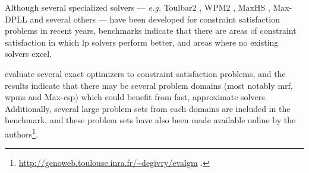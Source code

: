 Although several specialized solvers --- \emph{e.g.} Toulbar2 \parencite{Allouche10}, WPM2 \parencite{Ansotegui13b}, MaxHS \parencite{Davies13}, Max-DPLL \parencite{Larrosa08} and several others --- have been developed for constraint satisfaction problems in recent years, benchmarks indicate that there are areas of constraint satisfaction in which \gls{lp} solvers perform better, and areas where no existing solvers excel.

\Textcites{Allouche14b}{deGivry14} evaluate several exact optimizers to constraint satisfaction problems, and the results indicate that there may be several problem domains (most notably \acrshort{mrf}, \acrshort{wpms} and Max-\acrshort{csp}) which could benefit from fast, approximate solvers.
Additionally, several large problem sets from each domains are included in the benchmark, and these problem sets have also been made available online by the authors\footnote{\url{http://genoweb.toulouse.inra.fr/~degivry/evalgm} \parencite[\pno~7]{Allouche14b}.}.
